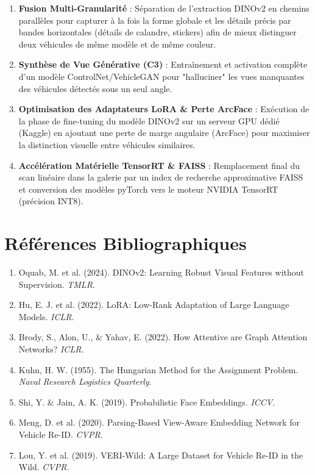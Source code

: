 \documentclass[12pt, a4paper]{article}
\begin{document}
\begin{enumerate}
    \item \textbf{Fusion Multi-Granularité} : Séparation de l'extraction DINOv2 en chemins parallèles pour capturer à la fois la forme globale et les détails précis par bandes horizontales (détails de calandre, stickers) afin de mieux distinguer deux véhicules de même modèle et de même couleur.
    \item \textbf{Synthèse de Vue Générative (C3)} : Entraînement et activation complète d'un modèle ControlNet/VehicleGAN pour "halluciner" les vues manquantes des véhicules détectés sous un seul angle.
    \item \textbf{Optimisation des Adaptateurs LoRA \& Perte ArcFace} : Exécution de la phase de fine-tuning du modèle DINOv2 sur un serveur GPU dédié (Kaggle) en ajoutant une perte de marge angulaire (ArcFace) pour maximiser la distinction visuelle entre véhicules similaires.
    \item \textbf{Accélération Matérielle TensorRT \& FAISS} : Remplacement final du scan linéaire dans la galerie par un index de recherche approximative FAISS et conversion des modèles pyTorch vers le moteur NVIDIA TensorRT (précision INT8).
\end{enumerate}

\section{Références Bibliographiques}

\begin{enumerate}
    \item Oquab, M. et al. (2024). DINOv2: Learning Robust Visual Features without Supervision. \textit{TMLR}.
    \item Hu, E. J. et al. (2022). LoRA: Low-Rank Adaptation of Large Language Models. \textit{ICLR}.
    \item Brody, S., Alon, U., \& Yahav, E. (2022). How Attentive are Graph Attention Networks? \textit{ICLR}.
    \item Kuhn, H. W. (1955). The Hungarian Method for the Assignment Problem. \textit{Naval Research Logistics Quarterly}.
    \item Shi, Y. \& Jain, A. K. (2019). Probabilistic Face Embeddings. \textit{ICCV}.
    \item Meng, D. et al. (2020). Parsing-Based View-Aware Embedding Network for Vehicle Re-ID. \textit{CVPR}.
    \item Lou, Y. et al. (2019). VERI-Wild: A Large Dataset for Vehicle Re-ID in the Wild. \textit{CVPR}.
\end{enumerate}
\end{document}
